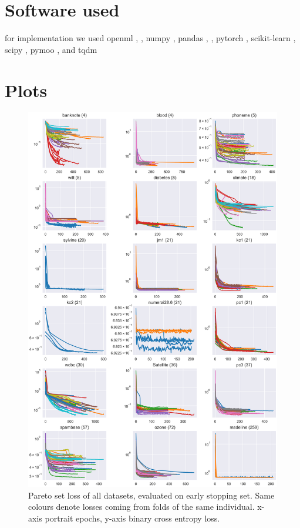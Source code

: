 \documentclass[twoside,11pt]{article}
\begin{document}
\newpage

\appendix
\section{Software used}
for implementation we used
openml \cite{OpenML}, \cite{OpenMLPython},
numpy \cite{numpy},
pandas \cite{pandas1}, \cite{pandas2},
pytorch \cite{PyTorch},
scikit-learn \cite{scikit-learn},
scipy \cite{SciPy},
pymoo \cite{pymoo}, and
tqdm \cite{tqdm}

\section{Plots}
\begin{figure}
  \centering
  \includegraphics[width=0.9\linewidth]{../code/export/plot_early_stopping_losses_pareto_set.png}
  \caption{Pareto set loss of all datasets, evaluated on early stopping set. Same colours denote losses coming from folds of the same individual.
            x-axis portrait epochs, y-axis binary cross entropy loss.}
  \label{fig-es-losses}
\end{figure}
\end{document}
